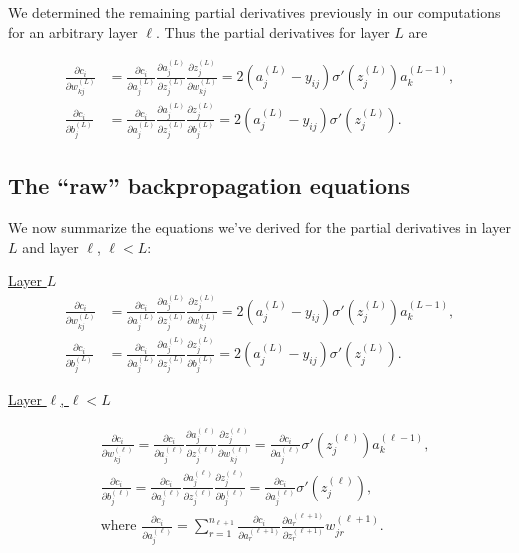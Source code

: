 \documentclass{article}
\begin{document}
	We determined the remaining partial derivatives previously in our computations for an arbitrary layer $\ell$. Thus the partial derivatives for layer $L$ are
	
	\begin{align*}
		\frac{\partial c_i}{\partial w^{(L)}_{kj}} &= \frac{\partial c_i}{\partial a^{(L)}_j} \frac{\partial a^{(L)}_j}{\partial z^{(L)}_j} \frac{\partial z^{(L)}_j}{\partial w^{(L)}_{kj}} = 2(a^{(L)}_j - y_{ij}) \sigma'(z^{(L)}_j) a^{(L - 1)}_k, \\
		\frac{\partial c_i}{\partial b^{(L)}_j} &= \frac{\partial c_i}{\partial a^{(L)}_j} \frac{\partial a^{(L)}_j}{\partial z^{(L)}_j} \frac{\partial z^{(L)}_j}{\partial b^{(L)}_j} = 2(a^{(L)}_j - y_{ij}) \sigma'(z^{(L)}_j).
	\end{align*}
	
	\subsection*{The ``raw'' backpropagation equations}
	
	We now summarize the equations we've derived for the partial derivatives in layer $L$ and layer $\ell$, $\ell < L$:
	
	\underline{Layer $L$}
	\begin{align*}
		\frac{\partial c_i}{\partial w^{(L)}_{kj}} &= \frac{\partial c_i}{\partial a^{(L)}_j} \frac{\partial a^{(L)}_j}{\partial z^{(L)}_j} \frac{\partial z^{(L)}_j}{\partial w^{(L)}_{kj}} = 2(a^{(L)}_j - y_{ij}) \sigma'(z^{(L)}_j) a^{(L - 1)}_k, \\
		\frac{\partial c_i}{\partial b^{(L)}_j} &= \frac{\partial c_i}{\partial a^{(L)}_j} \frac{\partial a^{(L)}_j}{\partial z^{(L)}_j} \frac{\partial z^{(L)}_j}{\partial b^{(L)}_j} = 2(a^{(L)}_j - y_{ij}) \sigma'(z^{(L)}_j).
	\end{align*}
	
	\underline{Layer $\ell$, $\ell < L$}
	
	\begin{align*}
		&\frac{\partial c_i}{\partial w^{(\ell)}_{kj}} = \frac{\partial c_i}{\partial a^{(\ell)}_j} \frac{\partial a^{(\ell)}_j}{\partial z^{(\ell)}_j} \frac{\partial z^{(\ell)}_j}{\partial w^{(\ell)}_{kj}} = \frac{\partial c_i}{\partial a^{(\ell)}_j} \sigma'(z^{(\ell)}_j) a^{(\ell - 1)}_k, \\
		&\frac{\partial c_i}{\partial b^{(\ell)}_j} = \frac{\partial c_i}{\partial a^{(\ell)}_j} \frac{\partial a^{(\ell)}_j}{\partial z^{(\ell)}_j} \frac{\partial z^{(\ell)}_j}{\partial b^{(\ell)}_j} = \frac{\partial c_i}{\partial a^{(\ell)}_j} \sigma'(z^{(\ell)}_j), \\
		&\text{where } \frac{\partial c_i}{\partial a^{(\ell)}_j} = \sum_{r = 1}^{n_{\ell+1}} \frac{\partial c_i}{\partial a^{(\ell + 1)}_r} \frac{\partial a^{(\ell + 1)}_r}{\partial z^{(\ell + 1)}_r} w^{(\ell + 1)}_{jr}.
	\end{align*}
	
\end{document}
